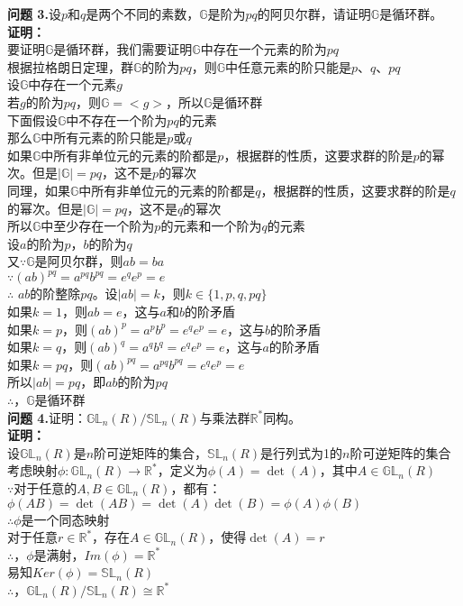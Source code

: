 \documentclass[a4paper]{CINTA}
\begin{document}
\textbf{问题 3.}设$p$和$q$是两个不同的素数，$\mathbb{G}$是阶为$pq$的阿贝尔群，请证明$\mathbb{G}$是循环群。\\
\textbf{证明：} \\
要证明$\mathbb{G}$是循环群，我们需要证明$\mathbb{G}$中存在一个元素的阶为$pq$ \\
根据拉格朗日定理，群$\mathbb{G}$的阶为$pq$，则$\mathbb{G}$中任意元素的阶只能是$p$、$q$、$pq$ \\
设$\mathbb{G}$中存在一个元素$g$ \\
若$g$的阶为$pq$，则$\mathbb{G}=<g>$，所以$\mathbb{G}$是循环群 \\
下面假设$\mathbb{G}$中不存在一个阶为$pq$的元素 \\
那么$\mathbb{G}$中所有元素的阶只能是$p$或$q$ \\
如果$\mathbb{G}$中所有非单位元的元素的阶都是$p$，根据群的性质，这要求群的阶是$p$的幂次。但是$|\mathbb{G}|=pq$，这不是$p$的幂次 \\
同理，如果$\mathbb{G}$中所有非单位元的元素的阶都是$q$，根据群的性质，这要求群的阶是$q$的幂次。但是$|\mathbb{G}|=pq$，这不是$q$的幂次 \\
所以$\mathbb{G}$中至少存在一个阶为$p$的元素和一个阶为$q$的元素 \\
设$a$的阶为$p$，$b$的阶为$q$ \\
又$\because \mathbb{G}$是阿贝尔群，则$ab=ba$ \\
$\because (ab)^{pq}=a^{pq}b^{pq}=e^qe^p=e$ \\
$\therefore$ $ab$的阶整除$pq$。设$|ab|=k$，则$k \in \{1,p,q,pq\}$ \\
如果$k=1$，则$ab=e$，这与$a$和$b$的阶矛盾 \\
如果$k=p$，则$(ab)^p=a^pb^p=e^qe^p=e$，这与$b$的阶矛盾 \\
如果$k=q$，则$(ab)^q=a^qb^q=e^qe^p=e$，这与$a$的阶矛盾 \\
如果$k=pq$，则$(ab)^{pq}=a^{pq}b^{pq}=e^qe^p=e$ \\
所以$|ab|=pq$，即$ab$的阶为$pq$ \\
$\therefore$，$\mathbb{G}$是循环群 \\

\textbf{问题 4.}证明：$\mathbb{GL}_n(R)/\mathbb{SL}_n(R)$与乘法群$\mathbb{R}^*$同构。\\
\textbf{证明：} \\
设$\mathbb{GL}_n(R)$是$n$阶可逆矩阵的集合，$\mathbb{SL}_n(R)$是行列式为1的$n$阶可逆矩阵的集合 \\
考虑映射$\phi:\mathbb{GL}_n(R) \to \mathbb{R}^*$，定义为$\phi(A)=\det(A)$，其中$A \in \mathbb{GL}_n(R)$ \\
$\because$对于任意的$A,B \in \mathbb{GL}_n(R)$，都有：$\phi(AB)=\det(AB)=\det(A)\det(B)=\phi(A)\phi(B)$ \\
$\therefore$$\phi$是一个同态映射 \\
对于任意$r \in \mathbb{R}^*$，存在$A \in \mathbb{GL}_n(R)$，使得$\det(A)=r$ \\
$\therefore$，$\phi$是满射，$Im(\phi)=\mathbb{R}^*$ \\
易知$Ker(\phi)=\mathbb{SL}_n(R)$ \\
$\therefore$，$\mathbb{GL}_n(R)/\mathbb{SL}_n(R) \cong \mathbb{R}^*$ \\
\end{document}
